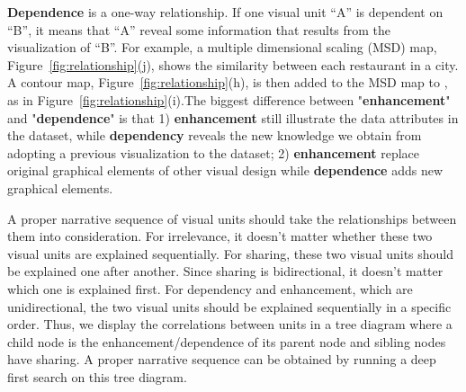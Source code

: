 \noindent
\textbf{Dependence} is a one-way relationship. If one visual unit ``A'' is dependent on ``B'', it means that ``A'' reveal some information that results from the visualization of ``B''. For example, a multiple dimensional scaling (MSD) map, Figure~\ref{fig:relationship}(j), shows the similarity between each restaurant in a city. A contour map, Figure~\ref{fig:relationship}(h), is then added to the MSD map to , as in Figure~\ref{fig:relationship}(i).The biggest difference between "\textbf{enhancement}" and "\textbf{dependence}" is that 1) \textbf{enhancement} still illustrate the data attributes in the dataset, while \textbf{dependency} reveals the new knowledge we obtain from adopting a previous visualization to the dataset; 2) \textbf{enhancement} replace original graphical elements of other visual design while \textbf{dependence} adds new graphical elements.

A proper narrative sequence of visual units should take the relationships between them into consideration. For irrelevance, it doesn't matter whether these two visual units are explained sequentially. For sharing, these two visual units should be explained one after another. Since sharing is bidirectional, it doesn't matter which one is explained first. For dependency and enhancement, which are unidirectional, the two visual units should be explained sequentially in a specific order. 
 Thus, we display the correlations between units in a tree diagram where a child node is the enhancement/dependence of its parent node and sibling nodes have sharing. A proper narrative sequence can be obtained by running a deep first search on this tree diagram. 




